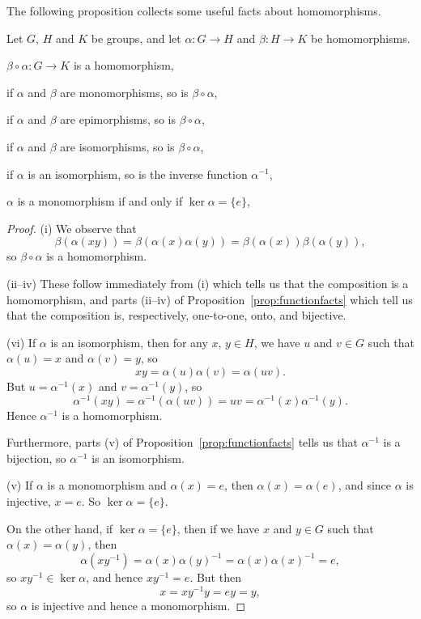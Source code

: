 The following proposition collects some useful facts about 
homomorphisms.

\begin{proposition}\label{prop:homomorphismfacts}
  Let $G$, $H$ and $K$ be groups, and let $\alpha: G \to H$ and 
  $\beta: H \to K$ be homomorphisms.
  \begin{theoremenum}
    \item $\beta \circ \alpha: G \to K$ is a homomorphism,
    
    \item if $\alpha$ and $\beta$ are monomorphisms, so is $\beta \circ 
      \alpha$,
    
    \item if $\alpha$ and $\beta$ are epimorphisms, so is $\beta \circ 
      \alpha$,
    
    \item if $\alpha$ and $\beta$ are isomorphisms, so is $\beta \circ 
      \alpha$,
    
    \item if $\alpha$ is an isomorphism, so is the inverse function 
      $\alpha^{-1}$,
    
    \item $\alpha$ is a monomorphism if and only if $\ker \alpha = 
      \{e\}$,
  \end{theoremenum}
\end{proposition}
\begin{proof}
  (i) We observe that
    \[
      \beta(\alpha(xy)) = \beta(\alpha(x)\alpha(y)) = 
      \beta(\alpha(x))\beta(\alpha(y)),
    \]
    so $\beta \circ \alpha$ is a homomorphism.
  
  (ii--iv) These follow immediately from (i) which tells us that the 
    composition is a homomorphism, and parts (ii--iv) of
    Proposition~\ref{prop:functionfacts} which tell us that the 
    composition is, respectively, one-to-one, onto, and bijective.
  
  (vi) If $\alpha$ is an isomorphism, then for any $x$, $y \in H$, we 
    have $u$ and $v \in G$ such that $\alpha(u) = x$ and $\alpha(v) = 
    y$, so
    \[
      xy = \alpha(u)\alpha(v) = \alpha(uv).
    \]
    But $u = \alpha^{-1}(x)$ and $v = \alpha^{-1}(y)$, so
    \[
      \alpha^{-1}(xy) = \alpha^{-1}(\alpha(uv)) = uv = 
      \alpha^{-1}(x)\alpha^{-1}(y).
    \]
    Hence $\alpha^{-1}$ is a homomorphism.
    
    Furthermore, parts (v) of Proposition~\ref{prop:functionfacts} 
    tells us that $\alpha^{-1}$ is a bijection, so $\alpha^{-1}$ is an 
    isomorphism.
  
  (v) If $\alpha$ is a monomorphism and $\alpha(x) = e$, then 
    $\alpha(x) = \alpha(e)$, and since $\alpha$ is injective, $x = e$.
    So $\ker \alpha = \{ e \}$.
  
    On the other hand, if $\ker \alpha = \{e\}$, then if we have $x$
    and $y \in G$ such that $\alpha(x) = \alpha(y)$, then
    \[
      \alpha(xy^{-1}) = \alpha(x)\alpha(y)^{-1} = 
      \alpha(x)\alpha(x)^{-1} = e,
    \]
    so $xy^{-1} \in \ker \alpha$, and hence $xy^{-1} = e$.  But then
    \[
      x = xy^{-1}y = ey = y,
    \]
    so $\alpha$ is injective and hence a monomorphism.
\end{proof}

